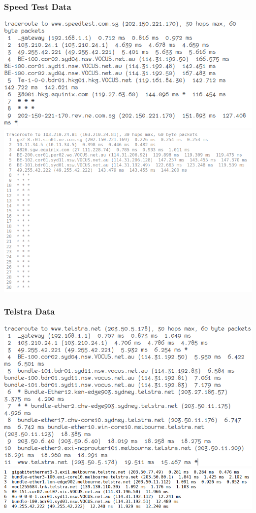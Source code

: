 \documentclass{article}
\begin{document}
\subsubsection{Speed Test Data}
\includegraphics[width=\textwidth]{img/tr_speed_test_host.png}
\includegraphics[width=\textwidth]{img/tr_speed_test_dest.png}

\subsubsection{Telstra Data}
\includegraphics[width=\textwidth]{img/tr_telstra_host.png}
\includegraphics[width=\textwidth]{img/tr_telstra_dest.png}
\end{document}
